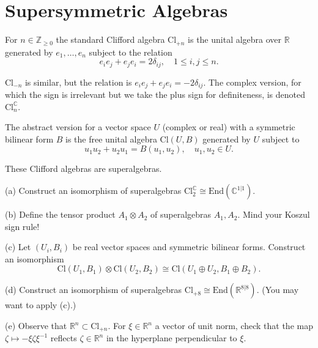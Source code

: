 \section*{Supersymmetric Algebras}

For $n \in \mathbb{Z}_{\geq 0}$ the standard Clifford algebra $\mathrm{Cl}_{+n}$ is the unital algebra over $\mathbb{R}$ generated by $e_1, \ldots, e_n$ subject to the relation
\[
e_i e_j + e_j e_i = 2 \delta_{ij}, \quad 1 \leq i, j \leq n.
\]

$\mathrm{Cl}_{-n}$ is similar, but the relation is $e_i e_j + e_j e_i = -2 \delta_{ij}$.
The complex version, for which the sign is irrelevant but we take the plus sign for definiteness, is denoted $\mathrm{Cl}_n^{\mathbb{C}}$.

The abstract version for a vector space $U$ (complex or real) with a symmetric bilinear form $B$ is the free unital algebra $\mathrm{Cl}(U, B)$ generated by $U$ subject to
\[
u_1 u_2 + u_2 u_1 = B(u_1, u_2), \quad u_1, u_2 \in U.
\]

These Clifford algebras are superalgebras.

\begin{question}
(a) Construct an isomorphism of superalgebras $\mathrm{Cl}_2^{\mathbb{C}} \cong \mathrm{End}(\mathbb{C}^{1|1})$.
\end{question}

\begin{question}
(b) Define the tensor product $A_1 \otimes A_2$ of superalgebras $A_1, A_2$. Mind your Koszul sign rule!
\end{question}

\begin{question}
(c) Let $(U_i, B_i)$ be real vector spaces and symmetric bilinear forms. Construct an isomorphism
\[
\mathrm{Cl}(U_1, B_1) \otimes \mathrm{Cl}(U_2, B_2) \cong \mathrm{Cl}(U_1 \oplus U_2, B_1 \oplus B_2).
\]
\end{question}

\begin{question}
(d) Construct an isomorphism of superalgebras $\mathrm{Cl}_{+8} \cong \mathrm{End}(\mathbb{R}^{8|8})$. (You may want to apply (c).)
\end{question}

\begin{question}
(e) Observe that $\mathbb{R}^n \subset \mathrm{Cl}_{+n}$. For $\xi \in \mathbb{R}^n$ a vector of unit norm, check that the map $\zeta \mapsto -\xi \zeta \xi^{-1}$ reflects $\zeta \in \mathbb{R}^n$ in the hyperplane perpendicular to $\xi$.
\end{question}

